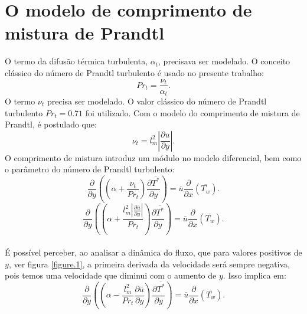 \section{O modelo de comprimento de mistura de Prandtl} 

O termo da difusão térmica turbulenta, $\alpha_t$, precisava ser modelado. O conceito clássico do número de Prandtl turbulento é usado no presente trabalho:
\begin{equation}
Pr_t = \frac{\nu_t}{\alpha_t}.
\end{equation} 
O termo $ \nu_t $ precisa ser modelado. O valor clássico do número de Prandtl turbulento $ Pr_t = 0.71 $ foi utilizado.
Com o modelo do comprimento de mistura de Prandtl, é postulado que:
\begin{equation}
\nu_t = {l^2_m} \left| \frac{\partial \overline{u}}{\partial y} \right|.
\end{equation}
O comprimento de mistura introduz um módulo no modelo diferencial, bem como o parâmetro do número de Prandtl turbulento:
\\
\begin{equation}
{\frac{\partial{}}{\partial{y}}} \left( \left( \alpha   
+ \frac{\nu_t}{Pr_t} \right) \frac{\partial \overline{T^\ast}}{\partial y} \right)
= 
\overline{u}\frac{\partial{}}{\partial{x}}\left(\overline{T_w}\right)  .
\end{equation}
\begin{equation}\label{equationquasela}
{\frac{\partial{}}{\partial{y}}} \left( \left( \alpha   
+ \frac{{l^2_m} \left| \frac{\partial \overline{u}}{\partial y} \right|}{Pr_t} \right) \frac{\partial \overline{T^\ast}}{\partial y} \right)
= 
\overline{u}\frac{\partial{}}{\partial{x}}\left(\overline{T_w}\right)  .
\end{equation}
\\

É possível perceber, ao analisar a dinâmica do fluxo, que para valores positivos de $ y $, ver figura \ref{figure.1}, a primeira derivada da velocidade será sempre negativa, pois temos uma velocidade que diminui com o aumento de $ y $. Isso implica em:\\
\begin{equation}
{\frac{\partial{}}{\partial{y}}} \left( \left( \alpha   
- \frac{{l^2_m}}{Pr_t}\frac{\partial \overline{u}}{\partial y} \right) \frac{\partial \overline{T^\ast}}{\partial y} \right)
= 
\overline{u}\frac{\partial{}}{\partial{x}}\left(\overline{T_w}\right)  .
\end{equation}



